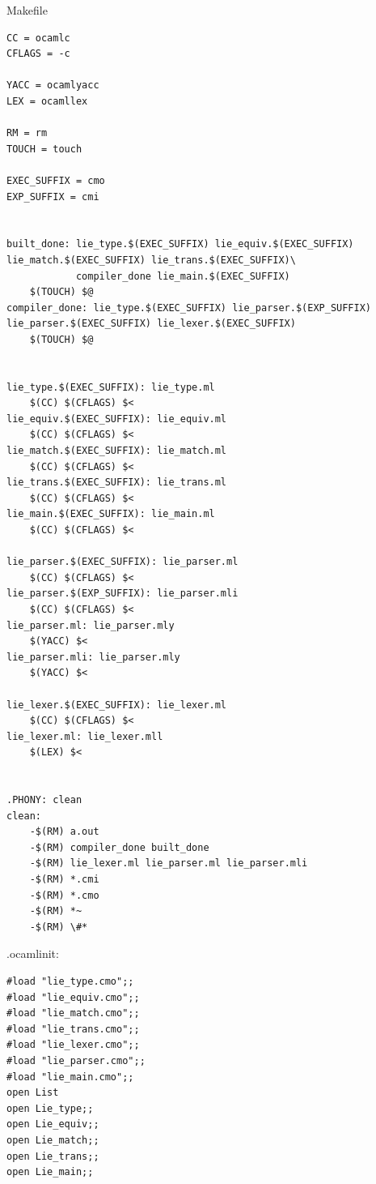 \documentclass[12pt]{article}
\begin{document}
\pagebreak
Makefile
\begin{tiny}
\begin{verbatim}
CC = ocamlc
CFLAGS = -c

YACC = ocamlyacc
LEX = ocamllex

RM = rm
TOUCH = touch

EXEC_SUFFIX = cmo
EXP_SUFFIX = cmi


built_done: lie_type.$(EXEC_SUFFIX) lie_equiv.$(EXEC_SUFFIX) lie_match.$(EXEC_SUFFIX) lie_trans.$(EXEC_SUFFIX)\
            compiler_done lie_main.$(EXEC_SUFFIX)
	$(TOUCH) $@
compiler_done: lie_type.$(EXEC_SUFFIX) lie_parser.$(EXP_SUFFIX) lie_parser.$(EXEC_SUFFIX) lie_lexer.$(EXEC_SUFFIX)
	$(TOUCH) $@


lie_type.$(EXEC_SUFFIX): lie_type.ml
	$(CC) $(CFLAGS) $<
lie_equiv.$(EXEC_SUFFIX): lie_equiv.ml
	$(CC) $(CFLAGS) $<
lie_match.$(EXEC_SUFFIX): lie_match.ml
	$(CC) $(CFLAGS) $<
lie_trans.$(EXEC_SUFFIX): lie_trans.ml
	$(CC) $(CFLAGS) $<
lie_main.$(EXEC_SUFFIX): lie_main.ml
	$(CC) $(CFLAGS) $<

lie_parser.$(EXEC_SUFFIX): lie_parser.ml
	$(CC) $(CFLAGS) $<
lie_parser.$(EXP_SUFFIX): lie_parser.mli
	$(CC) $(CFLAGS) $<
lie_parser.ml: lie_parser.mly
	$(YACC) $<
lie_parser.mli: lie_parser.mly
	$(YACC) $<

lie_lexer.$(EXEC_SUFFIX): lie_lexer.ml
	$(CC) $(CFLAGS) $<
lie_lexer.ml: lie_lexer.mll
	$(LEX) $<


.PHONY: clean
clean:
	-$(RM) a.out
	-$(RM) compiler_done built_done
	-$(RM) lie_lexer.ml lie_parser.ml lie_parser.mli
	-$(RM) *.cmi
	-$(RM) *.cmo
	-$(RM) *~
	-$(RM) \#*
\end{verbatim}
\end{tiny}

\vspace{5mm}
.ocamlinit:
\begin{tiny}
\begin{verbatim}
#load "lie_type.cmo";;
#load "lie_equiv.cmo";;
#load "lie_match.cmo";;
#load "lie_trans.cmo";;
#load "lie_lexer.cmo";;
#load "lie_parser.cmo";;
#load "lie_main.cmo";;
open List
open Lie_type;;
open Lie_equiv;;
open Lie_match;;
open Lie_trans;;
open Lie_main;;
\end{verbatim}
\end{tiny}
\end{document}
